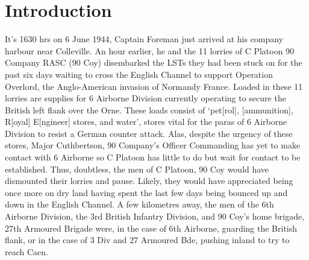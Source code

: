 \documentclass[noraggedright]{turabian-researchpaper}
\title{}
\subtitle{}
\date{\today} %
\author{}
\begin{document}
\maketitle

\section{Introduction}



It's 1630 hrs on 6 June 1944, Captain Foreman just arrived at his company 
harbour near Colleville.  An hour earlier, he and the 11 lorries of C Platoon
90 Company RASC (90 Coy) disembarked the LSTs they had been stuck on for the 
past six days waiting to cross the English Channel to support Operation 
Overlord, the Anglo-American invasion of Normandy 
France.\autocite[1--6 June 1944]{90wd}  Loaded in these 
11 lorries are supplies for 6 Airborne Division currently operating to secure 
the British left flank over the Orne.  These loads consist of `pet[rol], 
[ammunition], R[oyal] E[ngineer] stores, and water', stores vital for the 
paras of 6 Airborne Division to resist a German counter 
attack.\autocite[S \& T Report (June History Report) p 4]{90wd} 
Alas, despite the urgency of these stores, Major Cuthbertson, 90 Company's 
Officer Commanding has yet to make contact with 6 Airborne so C Platoon has 
little to do but wait for contact to be 
established.\autocite[6 June 1944]{90wd}
Thus, doubtless, the men of C Platoon, 90 Coy would have dismounted their 
lorries and pause.  Likely, they would have appreciated being once more
on dry land having spent the last few days being bounced up and down in the
English Channel.  A few kilometres away, the men of the 6th Airborne Division,
the 3rd British Infantry Division, and 90 Coy's home brigade, 27th Armoured
Brigade were, in the case of 6th Airborne, guarding the British flank, or
in the case of 3 Div and 27 Armoured Bde, pushing inland to try to reach
Caen.
\end{document}
